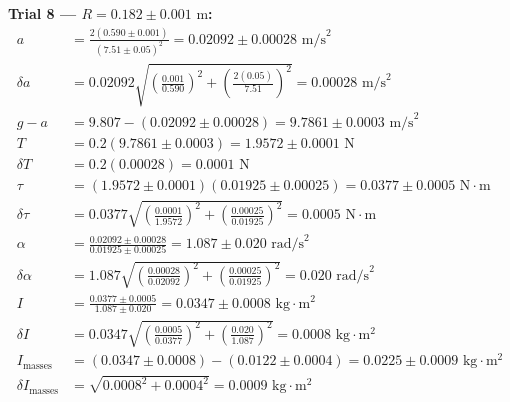 \documentclass[11pt]{article}
\begin{document}
\textbf{Trial 8 — $R = 0.182 \pm 0.001\text{ m}$:}
\begin{align*}
a &= \frac{2(0.590 \pm 0.001)}{(7.51 \pm 0.05)^2} = 0.02092 \pm 0.00028\text{ m/s}^2 \\
\delta a &= 0.02092\sqrt{\left(\frac{0.001}{0.590}\right)^2 + \left(\frac{2(0.05)}{7.51}\right)^2} = 0.00028\text{ m/s}^2 \\
g - a &= 9.807 - (0.02092 \pm 0.00028) = 9.7861 \pm 0.0003\text{ m/s}^2 \\
T &= 0.2(9.7861 \pm 0.0003) = 1.9572 \pm 0.0001\text{ N} \\
\delta T &= 0.2(0.00028) = 0.0001\text{ N} \\
\tau &= (1.9572 \pm 0.0001)(0.01925 \pm 0.00025) = 0.0377 \pm 0.0005\text{ N}\cdot\text{m} \\
\delta\tau &= 0.0377\sqrt{\left(\frac{0.0001}{1.9572}\right)^2 + \left(\frac{0.00025}{0.01925}\right)^2} = 0.0005\text{ N}\cdot\text{m} \\
\alpha &= \frac{0.02092 \pm 0.00028}{0.01925 \pm 0.00025} = 1.087 \pm 0.020\text{ rad/s}^2 \\
\delta\alpha &= 1.087\sqrt{\left(\frac{0.00028}{0.02092}\right)^2 + \left(\frac{0.00025}{0.01925}\right)^2} = 0.020\text{ rad/s}^2 \\
I &= \frac{0.0377 \pm 0.0005}{1.087 \pm 0.020} = 0.0347 \pm 0.0008\text{ kg}\cdot\text{m}^2 \\
\delta I &= 0.0347\sqrt{\left(\frac{0.0005}{0.0377}\right)^2 + \left(\frac{0.020}{1.087}\right)^2} = 0.0008\text{ kg}\cdot\text{m}^2 \\
I_{\text{masses}} &= (0.0347 \pm 0.0008) - (0.0122 \pm 0.0004) = 0.0225 \pm 0.0009\text{ kg}\cdot\text{m}^2 \\
\delta I_{\text{masses}} &= \sqrt{0.0008^2 + 0.0004^2} = 0.0009\text{ kg}\cdot\text{m}^2
\end{align*}
\end{document}
